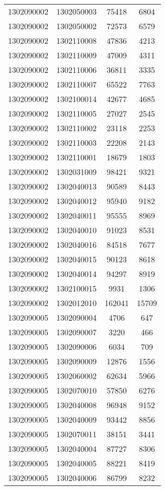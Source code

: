 \begin{longtable}{llcc}
1302090002 & 1302050003 & 75418 & 6804\\
1302090002 & 1302050002 & 72573 & 6579\\
1302090002 & 1302110008 & 47836 & 4213\\
1302090002 & 1302110009 & 47009 & 4311\\
1302090002 & 1302110006 & 36811 & 3335\\
1302090002 & 1302110007 & 65522 & 7763\\
1302090002 & 1302100014 & 42677 & 4685\\
1302090002 & 1302110005 & 27027 & 2545\\
1302090002 & 1302110002 & 23118 & 2253\\
1302090002 & 1302110003 & 22208 & 2143\\
1302090002 & 1302110001 & 18679 & 1803\\
1302090002 & 1302031009 & 98421 & 9321\\
1302090002 & 1302040013 & 90589 & 8443\\
1302090002 & 1302040012 & 95940 & 9182\\
1302090002 & 1302040011 & 95555 & 8969\\
1302090002 & 1302040010 & 91023 & 8531\\
1302090002 & 1302040016 & 84518 & 7677\\
1302090002 & 1302040015 & 90123 & 8618\\
1302090002 & 1302040014 & 94297 & 8919\\
1302090002 & 1302100015 & 9931 & 1306\\
1302090002 & 1302012010 & 162041 & 15709\\
1302090005 & 1302090004 & 4706 & 647\\
1302090005 & 1302090007 & 3220 & 466\\
1302090005 & 1302090006 & 6034 & 709\\
1302090005 & 1302090009 & 12876 & 1556\\
1302090005 & 1302060002 & 62634 & 5966\\
1302090005 & 1302070010 & 57850 & 6276\\
1302090005 & 1302040008 & 96948 & 9152\\
1302090005 & 1302040009 & 93442 & 8856\\
1302090005 & 1302070011 & 38151 & 3441\\
1302090005 & 1302040004 & 87727 & 8306\\
1302090005 & 1302040005 & 88221 & 8419\\
1302090005 & 1302040006 & 86799 & 8232\\

\end{longtable}
